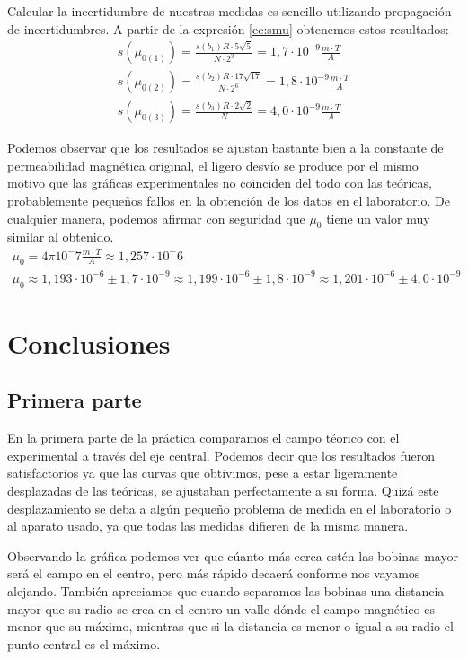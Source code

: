 \documentclass[12pt, a4paper, titlepage]{article}
\begin{document}
  Calcular la incertidumbre de nuestras medidas es sencillo utilizando propagación de incertidumbres. A partir de la expresión \ref{ec:smu} obtenemos estos resultados:
  \begin{gather*}
    s(\mu_{0(1)}) = \frac{s(b_1) R \cdot 5 \sqrt{5}}{N \cdot 2^3} = 1,7 \cdot 10^{-9} \frac{m \cdot T}{A} \\
    s(\mu_{0(2)}) = \frac{s(b_2) R \cdot 17 \sqrt{17}}{N \cdot 2^6} = 1,8 \cdot 10^{-9} \frac{m \cdot T}{A} \\
    s(\mu_{0(3)}) = \frac{s(b_3) R \cdot 2 \sqrt{2}}{N} = 4,0 \cdot 10^{-9} \frac{m \cdot T}{A}
  \end{gather*}

  Podemos observar que los resultados se ajustan bastante bien a la constante de permeabilidad magnética original, el ligero desvío se produce por el mismo motivo que las gráficas experimentales no coinciden del todo con las teóricas, probablemente pequeños fallos en la obtención de los datos en el laboratorio. De cualquier manera, podemos afirmar con seguridad que $\mu_0$ tiene un valor muy similar al obtenido.
  \begin{gather*}
    \mu_0 = 4\pi 10^-7 \frac{m \cdot T}{A} \approx 1,257 \cdot 10^-6 \\
    \mu_0 \approx 1,193 \cdot 10^{-6} \pm 1,7 \cdot 10^{-9} \approx 1,199 \cdot 10^{-6} \pm 1,8 \cdot 10^{-9} \approx 1,201 \cdot 10^{-6} \pm 4,0 \cdot 10^{-9}
  \end{gather*}

  \newpage
  \section{Conclusiones}

  \subsection{Primera parte}

  En la primera parte de la práctica comparamos el campo téorico con el experimental a través del eje central. Podemos decir que los resultados fueron satisfactorios ya que las curvas que obtivimos, pese a estar ligeramente desplazadas de las teóricas, se ajustaban perfectamente a su forma. Quizá este desplazamiento se deba a algún pequeño problema de medida en el laboratorio o al aparato usado, ya que todas las medidas difieren de la misma manera.

  Observando la gráfica podemos ver que cúanto más cerca estén las bobinas mayor será el campo en el centro, pero más rápido decaerá conforme nos vayamos alejando. También apreciamos que cuando separamos las bobinas una distancia mayor que su radio se crea en el centro un valle dónde el campo magnético es menor que su máximo, mientras que si la distancia es menor o igual a su radio el punto central es el máximo.
\end{document}
